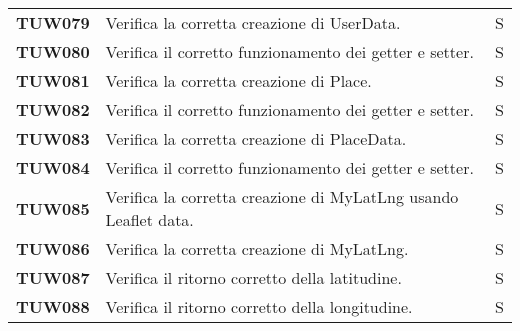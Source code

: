 \documentclass[../../piano-di-qualifica.tex]{subfiles}
\begin{document}
\begin{longtable}[H]{>{\centering\bfseries}m{3cm} >{}m{10cm} >{\centering\arraybackslash}m{3cm}}
  TUW079             & Verifica la corretta creazione di UserData.                                                                         & S                             \\

  TUW080             & Verifica il corretto funzionamento dei getter e setter.                                                             & S                             \\


  TUW081             & Verifica la corretta creazione di Place.                                                                            & S                             \\

  TUW082             & Verifica il corretto funzionamento dei getter e setter.                                                             & S                             \\


  TUW083             & Verifica la corretta creazione di PlaceData.                                                                        & S                             \\

  TUW084             & Verifica il corretto funzionamento dei getter e setter.                                                             & S                             \\


  TUW085             & Verifica la corretta creazione di MyLatLng usando Leaflet data.                                                     & S                             \\

  TUW086             & Verifica la corretta creazione di MyLatLng.                                                                         & S                             \\

  TUW087             & Verifica il ritorno corretto della latitudine.                                                                      & S                             \\

  TUW088             & Verifica il ritorno corretto della longitudine.                                                                     & S                             \\


\end{longtable}
\end{document}
